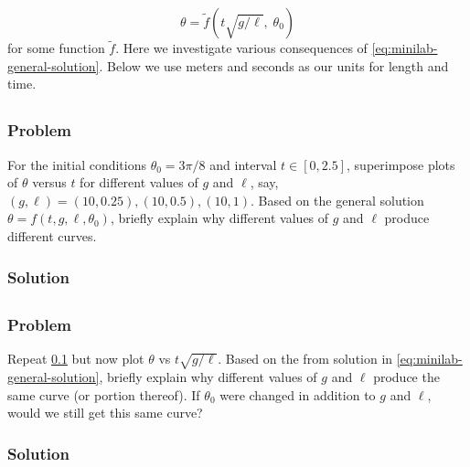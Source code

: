 \documentclass[12pt]{article}
\begin{document}
\begin{equation}
  \label{eq:minilab-general-solution}
  \theta = \tilde{f}(t\sqrt{g/\ell}, \;\theta_0)
\end{equation}
for some function $\tilde{f}$. Here we investigate various consequences of
\cref{eq:minilab-general-solution}. Below we use meters and seconds as our units
for length and time.

\subsection{}
  \label{sec:minilab-part-1}
  \subsubsection*{Problem}
  For the initial conditions $\theta_0=3\pi/8$ and interval $t\in[0,2.5]$,
  superimpose plots of $\theta$ versus $t$ for different values of $g$ and $\ell$,
  say, $(g,\ell)=(10, 0.25), (10, 0.5), (10, 1)$. Based on the general solution
  $\theta = f(t,g,\ell,\theta_0)$, briefly explain why different values of $g$ and
  $\ell$ produce different curves.

  \subsubsection*{Solution}
  \todo

\subsection{}
  \label{sec:minilab-part-2}
  \subsubsection*{Problem}
  Repeat \cref{sec:minilab-part-1} but now plot $\theta$ vs $t\sqrt{g/\ell}$.
  Based on the from solution in \cref{eq:minilab-general-solution}, briefly
  explain why different values of $g$ and $\ell$ produce the same curve (or
  portion thereof). If $\theta_0$ were changed in addition to $g$ and $\ell$,
  would we still get this same curve?

  \subsubsection*{Solution}
    \todo

\subsection{}
\end{document}
